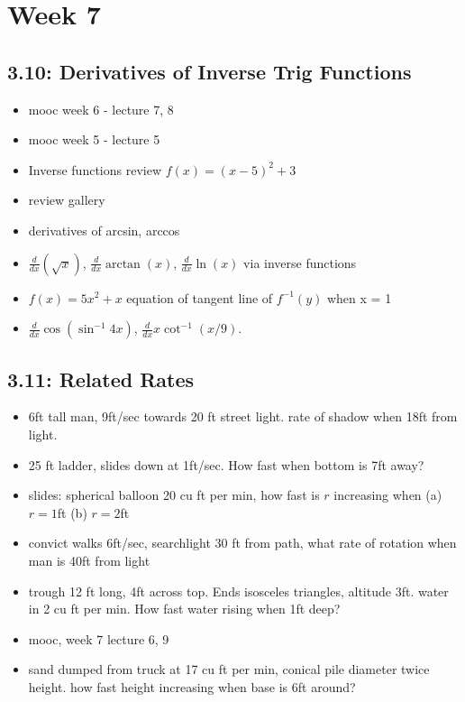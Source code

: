 \documentclass[11pt]{article}
\begin{document}
\section*{Week 7}

\subsection{3.10: Derivatives of Inverse Trig Functions}
\begin{itemize}
	\item mooc week 6 - lecture 7, 8
	\item mooc week 5 - lecture 5
	\item Inverse functions review $f(x) = (x-5)^2 + 3$
	\item review gallery
	\item  derivatives of arcsin, arccos
	\item $\frac{d}{dx} (\sqrt{x})$, $\frac{d}{dx} \arctan(x)$, $\frac{d}{dx} \ln(x)$ via inverse functions
	\item $f(x) = 5x^2 + x$ equation of tangent line of $f^{-1}(y)$ when x = 1
	\item $\frac{d}{dx} \cos(\sin^{-1} 4x)$, $\frac{d}{dx} x \cot^{-1}(x/9)$.
\end{itemize}

\subsection{3.11: Related Rates}
\begin{itemize}
	\item 6ft tall man, 9ft/sec towards 20 ft street light.  rate of shadow when 18ft from light.
	\item 25 ft ladder, slides down at 1ft/sec.  How fast when bottom is 7ft away?
	\item slides: spherical balloon 20 cu ft per min, how fast is $r$ increasing when (a) $r = 1$ft (b) $r= 2$ft
	\item convict walks 6ft/sec, searchlight 30 ft from path, what rate of rotation when man is 40ft from light
	\item trough 12 ft long, 4ft across top.  Ends isosceles triangles, altitude 3ft.  water in 2 cu ft per min.  How fast water rising when 1ft deep?
	\item mooc, week 7 lecture 6, 9
	\item sand dumped from truck at 17 cu ft per min, conical pile diameter twice height.  how fast height increasing when base is 6ft around?
\end{itemize}
\end{document}
